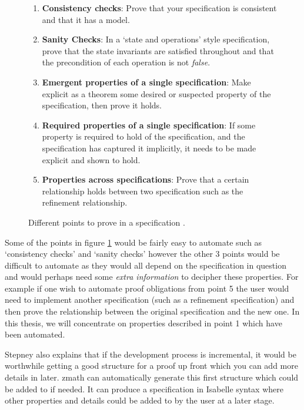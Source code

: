 \begin{figure}[H]
\begin{enumerate}
\item \textbf{Consistency checks}: Prove that your specification is consistent
and that it has a model.

\item \textbf{Sanity Checks}: In a `state and operations' style specification,
prove that the state invariants are satisfied throughout and that the
precondition of each operation is not \emph{false}.

\item \textbf{Emergent properties of a single specification}: Make explicit as a
theorem some desired or suspected property of the specification, then prove it
holds.

\item \textbf{Required properties of a single specification}: If some property
is required to hold of the specification, and the specification has captured it
implicitly, it needs to be made explicit and shown to hold.

\item \textbf{Properties across specifications}: Prove that a certain
relationship holds between two specification such as the refinement
relationship.
\end{enumerate}
\caption{Different points to prove in a specification \cite{stepney1998tale}. \label{fig:ptp}}
\end{figure}

Some of the points in figure \ref{fig:ptp} would be fairly easy to automate such
as `consistency checks' and `sanity checks' however the other 3 points would be
difficult to automate as they would all depend on the specification in question
and would perhaps need some \emph{extra information} to decipher these
properties. For example if one wish to automate proof obligations from point 5
the user would need to implement another specification (such as a refinement
specification) and then prove the relationship between the original
specification and the new one. In this thesis, we will concentrate on properties
described in point 1 which have been automated. 

Stepney also explains that if the development process is incremental, it would
be worthwhile getting a good structure for a proof up front which you can add
more details in later. \gls{zmath}  can automatically generate this first
structure which could be added to if needed. It can produce a specification in
Isabelle syntax where other properties and details could be added to by the user
at a later stage.

